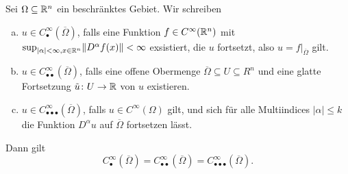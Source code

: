 \begin{lem}
  Sei $\Omega \subseteq \mathbb{R}^n$ ein beschränktes Gebiet.
  Wir schreiben
  \begin{enumerate}[(a)]
    \item $u \in C^\infty_\bullet(\overline\Omega)$,
  falls eine Funktion $f \in C^\infty(\mathbb{R}^n)$ mit $\sup_{|\alpha| < \infty, x \in \mathbb{R}^n} \lVert D^\alpha f(x) \rVert <  \infty$ exsistiert, die $u$ fortsetzt, also $u = f|_{\overline\Omega}$ gilt.
    \item $u \in C^\infty_{\bullet\bullet}(\overline\Omega)$,
  falls eine offene Obermenge $\overline\Omega \subseteq U \subseteq R^n$ und eine glatte Fortsetzung $\tilde u \colon U \to \mathbb{R}$ von $u$ existieren.
  \item $ u \in C^\infty_{\bullet\bullet\bullet}(\overline\Omega)$,
  falls $u \in C^\infty(\Omega)$ gilt, und sich für alle Multiindices $|\alpha|\leq k$ die Funktion $D^\alpha u$ auf $\overline\Omega$ fortsetzen lässt.
  \end{enumerate}

  Dann gilt
  $$
    C^\infty_{\bullet}(\overline\Omega) =
    C^\infty_{\bullet\bullet}(\overline\Omega) =
    C^\infty_{\bullet\bullet\bullet}(\overline\Omega).
  $$
\end{lem}

